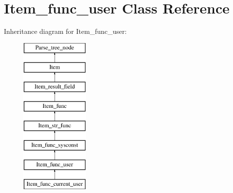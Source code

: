 \hypertarget{classItem__func__user}{}\section{Item\+\_\+func\+\_\+user Class Reference}
\label{classItem__func__user}
Inheritance diagram for Item\+\_\+func\+\_\+user\+:\begin{figure}[H]
\begin{center}
\leavevmode
\includegraphics[height=8.000000cm]{classItem__func__user}
\end{center}
\end{figure}
